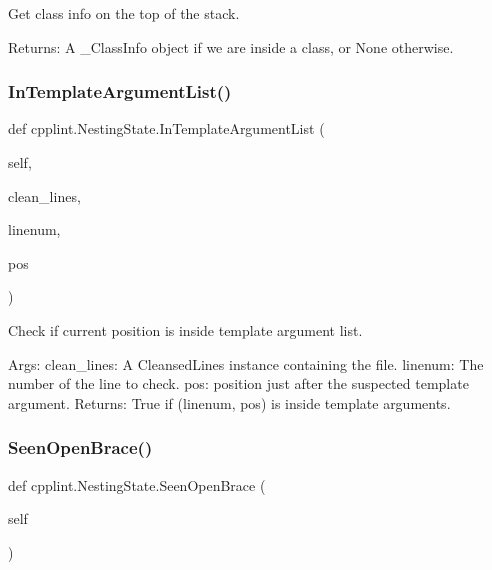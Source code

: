 \begin{DoxyVerb}Get class info on the top of the stack.

Returns:
  A _ClassInfo object if we are inside a class, or None otherwise.
\end{DoxyVerb}
 \mbox{\label{classcpplint_1_1NestingState_a8f4e9ba1aaa0459de2bedd966e7a2b54}} 
\subsubsection{\texorpdfstring{In\+Template\+Argument\+List()}{InTemplateArgumentList()}}
{\footnotesize\ttfamily def cpplint.\+Nesting\+State.\+In\+Template\+Argument\+List (\begin{DoxyParamCaption}\item[{}]{self,  }\item[{}]{clean\+\_\+lines,  }\item[{}]{linenum,  }\item[{}]{pos }\end{DoxyParamCaption})}

\begin{DoxyVerb}Check if current position is inside template argument list.

Args:
  clean_lines: A CleansedLines instance containing the file.
  linenum: The number of the line to check.
  pos: position just after the suspected template argument.
Returns:
  True if (linenum, pos) is inside template arguments.
\end{DoxyVerb}
 \mbox{\label{classcpplint_1_1NestingState_a15abc0719a22ca8fbb7a8235f0e22b3e}} 
\subsubsection{\texorpdfstring{Seen\+Open\+Brace()}{SeenOpenBrace()}}
{\footnotesize\ttfamily def cpplint.\+Nesting\+State.\+Seen\+Open\+Brace (\begin{DoxyParamCaption}\item[{}]{self }\end{DoxyParamCaption})}

